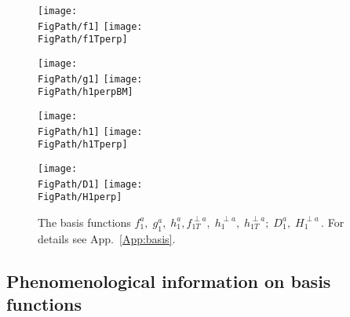 \documentclass[a4paper,11pt]{article}
\newcommand*{\FigPath}{./figs}%
\begin{document}
\begin{figure}[b!]
\centering
\texttt{[image: \\FigPath/f1]} 
\texttt{[image: \\FigPath/f1Tperp]}
  
\texttt{[image: \\FigPath/g1]}  
\texttt{[image: \\FigPath/h1perpBM]}  

\texttt{[image: \\FigPath/h1]}  
\texttt{[image: \\FigPath/h1Tperp]}


\texttt{[image: \\FigPath/D1]} 
\texttt{[image: \\FigPath/H1perp]} 
\caption{\label{basis} 
	The basis functions $f_1^a, \; g_1^a, \; h_1^a, 
	f_{1T}^{\perp a}, \;h_1^{\perp a},\; h_{1T}^{\perp a}; \; 
	D_1^a, \; H_1^{\perp a} \,$. For details see App.~\ref{App:basis}.}
\end{figure}


\subsection{Phenomenological information on basis functions}
\label{Sec-4.3:plot-basis-functions}
\end{document}

